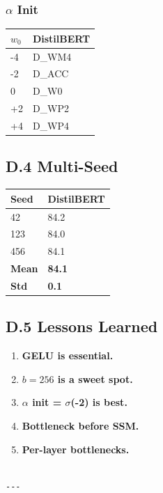\subsubsection{$\alpha$ Init}

\begin{table}[H]
\centering
\small
\begin{tabular}{ll}
\toprule
\textbf{$w_0$} & \textbf{DistilBERT} \\
\midrule
-4 & {{D\_WM4}} \\
-2 & {{D\_ACC}} \\
0 & {{D\_W0}} \\
+2 & {{D\_WP2}} \\
+4 & {{D\_WP4}} \\
\bottomrule
\end{tabular}
\end{table}

\subsection{D.4 Multi-Seed}

\begin{table}[H]
\centering
\small
\begin{tabular}{ll}
\toprule
\textbf{Seed} & \textbf{DistilBERT} \\
\midrule
42 & 84.2 \\
123 & 84.0 \\
456 & 84.1 \\
\textbf{Mean} & \textbf{84.1} \\
\textbf{Std} & \textbf{0.1} \\
\bottomrule
\end{tabular}
\end{table}

\subsection{D.5 Lessons Learned}

\begin{enumerate}
\item \textbf{GELU is essential.}
\item \textbf{$b = 256$ is a sweet spot.}
\item \textbf{$\alpha$ init = $\sigma$(-2) is best.}
\item \textbf{Bottleneck before SSM.}
\item \textbf{Per-layer bottlenecks.}
\end{enumerate}
\begin{lstlisting}

---
\end{lstlisting}
